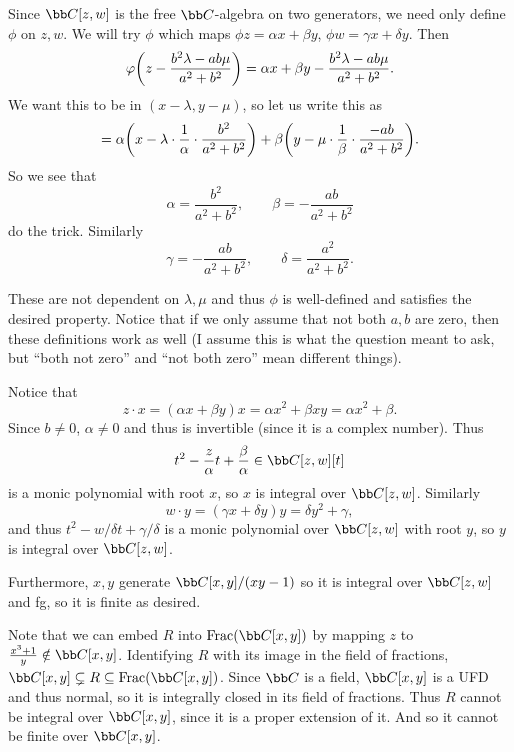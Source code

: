         Since $\bC[z,w]$ is the free $\bC$-algebra on two generators, we need only define $\phi$ on $z,w$.
        We will try $\phi$ which maps $\phi z=\alpha x+\beta y$, $\phi w=\gamma x+\delta y$.
        Then
        $$ \varphi\mathopen{}\mathclose{\left(z-{{b^2\lambda-ab\mu}\over{a^2+b^2}}\right)} = \alpha x + \beta y - {{b^2\lambda-ab\mu}\over{a^2+b^2}} . $$
        We want this to be in $(x-\lambda,y-\mu)$, so let us write this as
        $$ = \alpha\mathopen{}\mathclose{\left(x - \lambda\cdot{{1}\over{\alpha}}\cdot{{b^2}\over{a^2+b^2}}\right)} + \beta\mathopen{}\mathclose{\left(y - \mu\cdot{{1}\over{\beta}}\cdot{{-ab}\over{a^2+b^2}}\right)} . $$
        So we see that
        $$ \alpha = \frac{b^2}{a^2+b^2},\qquad \beta = -\frac{ab}{a^2+b^2} $$
        do the trick.
        Similarly
        $$ \gamma = -\frac{ab}{a^2+b^2},\qquad \delta = \frac{a^2}{a^2+b^2} . $$

        These are not dependent on $\lambda,\mu$ and thus $\phi$ is well-defined and satisfies the desired property.
        Notice that if we only assume that not both $a,b$ are zero, then these definitions work as well (I assume this is what the question meant to ask, but ``both not zero'' and ``not both zero''
        mean different things).

        \item Notice that
        $$ z\cdot x = (\alpha x + \beta y)x = \alpha x^2 + \beta xy = \alpha x^2 + \beta . $$
        Since $b\neq0$, $\alpha\neq0$ and thus is invertible (since it is a complex number).
        Thus
        $$ t^2 - \frac z\alpha t + \frac\beta\alpha \in \bC[z,w][t] $$
        is a monic polynomial with root $x$, so $x$ is integral over $\bC[z,w]$.
        Similarly
        $$ w\cdot y = (\gamma x + \delta y)y = \delta y^2 + \gamma , $$
        and thus $t^2-w/\delta t+\gamma/\delta$ is a monic polynomial over $\bC[z,w]$ with root $y$, so $y$ is integral over $\bC[z,w]$.

        Furthermore, $x,y$ generate $\bC[x,y]/(xy-1)$ so it is integral over $\bC[z,w]$ and fg, so it is finite as desired.
    \eenum

    \item
    \benum
        \item Note that we can embed $R$ into $\Frac(\bC[x,y])$ by mapping $z$ to $\frac{x^3+1}y\notin\bC[x,y]$.
        Identifying $R$ with its image in the field of fractions, $\bC[x,y]\subsetneq R\subseteq\Frac(\bC[x,y])$.
        Since $\bC$ is a field, $\bC[x,y]$ is a UFD and thus normal, so it is integrally closed in its field of fractions.
        Thus $R$ cannot be integral over $\bC[x,y]$, since it is a proper extension of it.
        And so it cannot be finite over $\bC[x,y]$.

